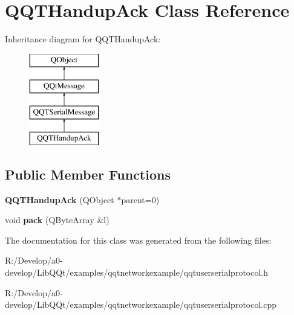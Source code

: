 \hypertarget{class_q_q_t_handup_ack}{}\section{Q\+Q\+T\+Handup\+Ack Class Reference}
\label{class_q_q_t_handup_ack}
Inheritance diagram for Q\+Q\+T\+Handup\+Ack\+:\begin{figure}[H]
\begin{center}
\leavevmode
\includegraphics[height=4.000000cm]{class_q_q_t_handup_ack}
\end{center}
\end{figure}
\subsection*{Public Member Functions}
\begin{DoxyCompactItemize}
\item 
\mbox{\label{class_q_q_t_handup_ack_a0b971f41925f85db834fb2522d1f2f13}} 
{\bfseries Q\+Q\+T\+Handup\+Ack} (Q\+Object $\ast$parent=0)
\item 
\mbox{\label{class_q_q_t_handup_ack_afe925ca15803b56912bb0aba9d01d66c}} 
void {\bfseries pack} (Q\+Byte\+Array \&l)
\end{DoxyCompactItemize}


The documentation for this class was generated from the following files\+:\begin{DoxyCompactItemize}
\item 
R\+:/\+Develop/a0-\/develop/\+Lib\+Q\+Qt/examples/qqtnetworkexample/qqtuserserialprotocol.\+h\item 
R\+:/\+Develop/a0-\/develop/\+Lib\+Q\+Qt/examples/qqtnetworkexample/qqtuserserialprotocol.\+cpp\end{DoxyCompactItemize}
